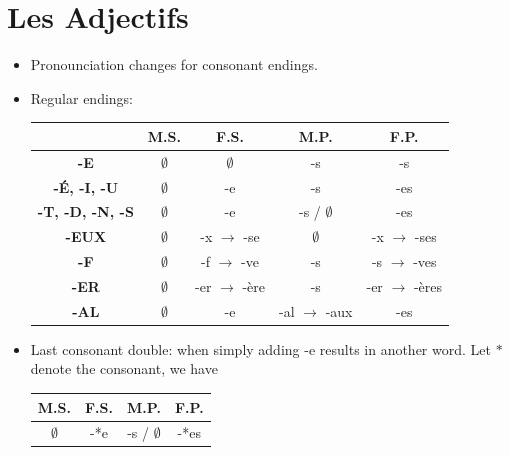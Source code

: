 \documentclass{book}
\begin{document}
\chapter{Les Adjectifs}
    \begin{itemize}
        \item Pronounciation changes for consonant endings.
        \item Regular endings:
            \begin{center}
                \begin{tabular}{|c|c|c|c|c|}
                    \hline
                    & \textbf{M.S.} & \textbf{F.S.} & \textbf{M.P.} & \textbf{F.P.} \\
                    \hline
                    \textbf{-E} & $\emptyset$ & $\emptyset$ & -s & -s \\
                    \hline
                    \textbf{-É, -I, -U} & $\emptyset$ & -e & -s & -es \\
                    \hline
                    \textbf{-T, -D, -N, -S} & $\emptyset$ & -e & -s / $\emptyset$ & -es \\
                    \hline
                    \textbf{-EUX} & $\emptyset$ & -x $\to$ -se & $\emptyset$ & -x $\to$ -ses \\
                    \hline
                    \textbf{-F} & $\emptyset$ & -f $\to$ -ve & -s & -s $\to$ -ves \\
                    \hline
                    \textbf{-ER} & $\emptyset$ & -er $\to$ -ère & -s & -er $\to$ -ères \\
                    \hline
                    \textbf{-AL} & $\emptyset$ & -e & -al $\to$ -aux & -es \\
                    \hline
                \end{tabular}
            \end{center}
        \item Last consonant double: when simply adding -e results in another word. Let $*$ denote the consonant, we have
            \begin{center}
                \begin{tabular}{|c|c|c|c|}
                    \hline 
                    \textbf{M.S.} & \textbf{F.S.} & \textbf{M.P.} & \textbf{F.P.} \\
                    \hline
                    $\emptyset$ & -*e & -s / $\emptyset$ & -*es \\
                    \hline
                \end{tabular}

\end{center}
\end{itemize}
\end{document}
